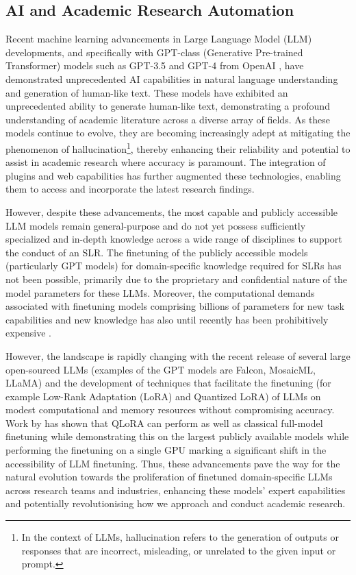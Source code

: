 \documentclass{article}
\begin{document}
\subsection{AI and Academic Research Automation}

Recent machine learning advancements in Large Language Model (LLM) developments, and specifically with GPT-class (Generative Pre-trained Transformer) models such as GPT-3.5 and GPT-4 from OpenAI \cite{openai}, have demonstrated unprecedented AI capabilities in natural language understanding and generation of human-like text. These models have exhibited an unprecedented ability to generate human-like text, demonstrating a profound understanding of academic literature across a diverse array of fields. As these models continue to evolve, they are becoming increasingly adept at mitigating the phenomenon of hallucination\footnote{In the context of LLMs, hallucination refers to the generation of outputs or responses that are incorrect, misleading, or unrelated to the given input or prompt.}, thereby enhancing their reliability and potential to assist in academic research where accuracy is paramount. The integration of plugins and web capabilities has further augmented these technologies, enabling them to access and incorporate the latest research findings. 

However, despite these advancements, the most capable and publicly accessible LLM models remain general-purpose and do not yet possess sufficiently specialized and in-depth knowledge across a wide range of disciplines to support the conduct of an SLR. The finetuning of the publicly accessible models (particularly GPT models) for domain-specific knowledge required for SLRs has not been possible, primarily due to the proprietary and confidential nature of the model parameters for these LLMs. Moreover, the computational demands associated with finetuning models comprising billions of parameters for new task capabilities and new knowledge has also until recently has been prohibitively expensive \cite{dettmers2023qlora}.

However, the landscape is rapidly changing with the recent release of several large open-sourced LLMs (examples of the GPT models are Falcon, MosaicML, LLaMA\cite{touvron2023llama}) and the development of techniques that facilitate the finetuning (for example Low-Rank Adaptation (LoRA) \cite{hu2021lora} and Quantized LoRA\cite{dettmers2023qlora}) of LLMs on modest computational and memory resources without compromising accuracy. Work by \citet{dettmers2023qlora} has shown that QLoRA can perform as well as classical full-model finetuning while demonstrating this on the largest publicly available models while performing the finetuning on a single GPU marking a significant shift in the accessibility of LLM finetuning. Thus, these advancements pave the way for the natural evolution towards the proliferation of finetuned domain-specific LLMs across research teams and industries, enhancing these models' expert capabilities and potentially revolutionising how we approach and conduct academic research.
\end{document}

